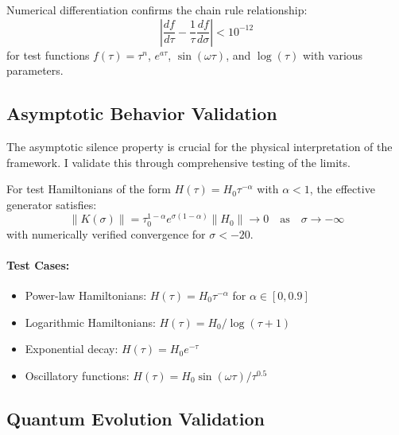 \begin{theorem}
\label{thm:chain_rule_validation}
Numerical differentiation confirms the chain rule relationship:
\begin{equation}
\left| \frac{df}{d\tau} - \frac{1}{\tau} \frac{df}{d\sigma} \right| < 10^{-12}
\end{equation}
for test functions $f(\tau) = \tau^n$, $e^{a\tau}$, $\sin(\omega\tau)$, and $\log(\tau)$ with various parameters.
\end{theorem}

\subsection{Asymptotic Behavior Validation}
\label{subsec:asymptotic_validation}

The asymptotic silence property is crucial for the physical interpretation of the framework. I validate this through comprehensive testing of the limits.

\begin{theorem}
\label{thm:asymptotic_silence_verification}
For test Hamiltonians of the form $H(\tau) = H_0 \tau^{-\alpha}$ with $\alpha < 1$, the effective generator satisfies:
\begin{equation}
\|K(\sigma)\| = \tau_0^{1-\alpha} e^{\sigma(1-\alpha)} \|H_0\| \to 0 \quad \text{as} \quad \sigma \to -\infty
\end{equation}
with numerically verified convergence for $\sigma < -20$.
\end{theorem}

\paragraph{Test Cases:}
\begin{itemize}
\item Power-law Hamiltonians: $H(\tau) = H_0 \tau^{-\alpha}$ for $\alpha \in [0, 0.9]$
\item Logarithmic Hamiltonians: $H(\tau) = H_0 / \log(\tau + 1)$
\item Exponential decay: $H(\tau) = H_0 e^{-\tau}$
\item Oscillatory functions: $H(\tau) = H_0 \sin(\omega\tau) / \tau^{0.5}$
\end{itemize}

\subsection{Quantum Evolution Validation}
\label{subsec:quantum_evolution_validation}

